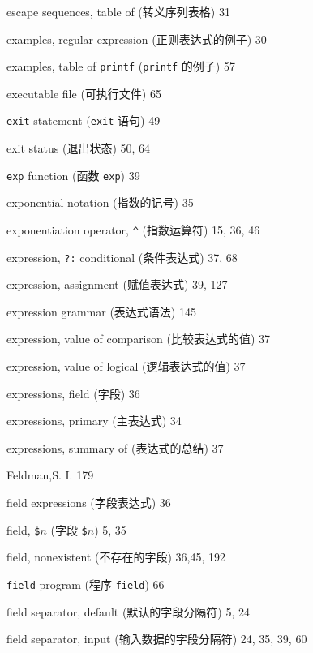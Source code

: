 \begin{multicols}{3}
\hangindent=3pc  escape sequences, table of (转义序列表格) 31

\hangindent=3pc  examples, regular expression (正则表达式的例子) 30

\hangindent=3pc  examples, table of \verb'printf'
(\verb'printf' 的例子) 57

\hangindent=3pc  executable file (可执行文件) 65

\hangindent=3pc  \verb'exit' statement (\verb'exit' 语句) 49

\hangindent=3pc  exit status (退出状态) 50, 64

\hangindent=3pc  \verb'exp' function (函数 \verb'exp') 39

\hangindent=3pc  exponential notation (指数的记号) 35

\hangindent=3pc  exponentiation operator, \verb'^' (指数运算符)
15, 36, 46

\hangindent=3pc  expression, \verb'?:' conditional (条件表达式)
37, 68

\hangindent=3pc  expression, assignment (赋值表达式) 39, 127

\hangindent=3pc  expression grammar (表达式语法) 145

\hangindent=3pc  expression, value of comparison (比较表达式的值) 37

\hangindent=3pc  expression, value of logical (逻辑表达式的值) 37

\hangindent=3pc  expressions, field (字段) 36

\hangindent=3pc  expressions, primary (主表达式) 34

\hangindent=3pc  expressions, summary of (表达式的总结) 37

\hangindent=3pc  Feldman,S. I. 179

\hangindent=3pc  field expressions (字段表达式) 36

\hangindent=3pc  field, \verb'$'$n$ (字段 \verb'$'$n$) 5, 35

\hangindent=3pc  field, nonexistent (不存在的字段) 36,45, 192

\hangindent=3pc  \verb'field' program (程序 \verb'field') 66

\hangindent=3pc  field separator, default (默认的字段分隔符) 5, 24

\hangindent=3pc  field separator, input (输入数据的字段分隔符)
24, 35, 39, 60


\end{multicols}
